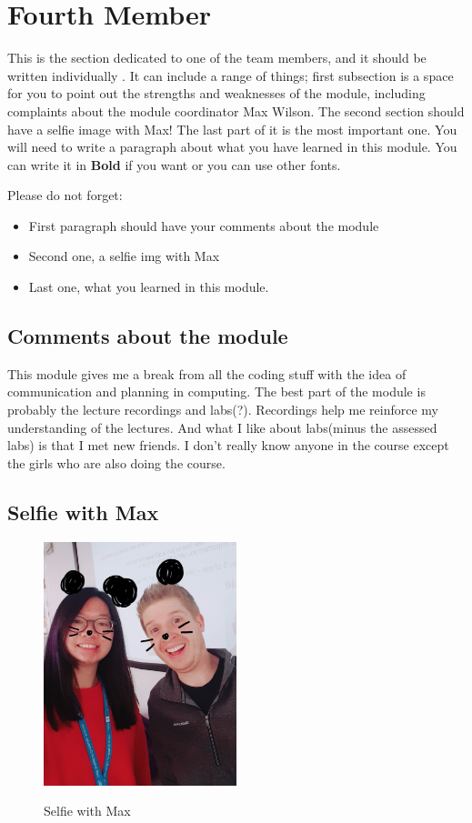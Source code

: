 \section{Fourth Member}
This is the section dedicated to one of the team members, and it should be written individually . It can include a range of things; first subsection is a space for you to point out the strengths and weaknesses of the module, including complaints about the module coordinator Max Wilson. The second section should have a selfie image with Max! The last part of it is the most important one. You will need to write a paragraph about what you have learned in this module. You can write it in \textbf{Bold} if you want or you can use other fonts. 

Please do not forget:
\begin{itemize}
	\item First paragraph should have your comments about the module
	\item Second one, a selfie img with Max
	\item Last one, what you learned in this module.
\end{itemize}

\subsection{Comments about the module}
This module gives me a break from all the coding stuff with the idea of communication and planning in computing. The best part of the module is probably the lecture recordings and labs(?). Recordings help me reinforce my understanding of the lectures. And what I like about labs(minus the assessed labs) is that I met new friends. I don't really know anyone in the course except the girls who are also doing the course.

\subsection{Selfie with Max}
\begin{figure}[h]
\caption{Selfie with Max}
\centering
\includegraphics[width=0.5\textwidth]{Selfieee.jpg}
\label{fig:selfie}
\end{figure}

